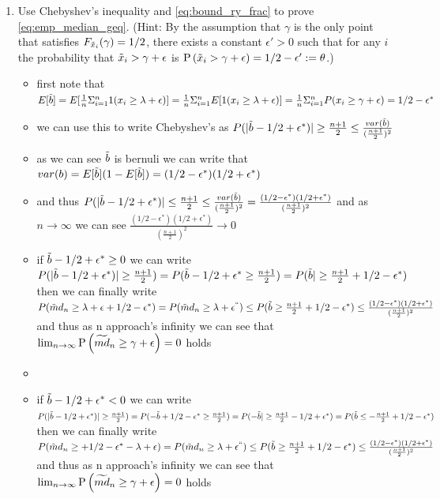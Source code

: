 \documentclass[12pt,twoside]{article}
\begin{document}
\begin{enumerate}
\begin{enumerate}
\item Use Chebyshev's inequality and \eqref{eq:bound_ry_frac} to prove \eqref{eq:emp_median_geq}. (Hint: By the assumption that $\gamma$ is the only point that satisfies $F_{\tilde{  x }_i}(\gamma) = 1/2$, there exists a constant  $\epsilon'>0$ such that for any $i$ the probability that $\tilde{  x }_i > \gamma + \epsilon$ is $\mathrm{P}\left( \tilde{  x }_i > \gamma + \epsilon \right) = 1/2 - \epsilon' := \theta$.)
\begin{itemize}
    \item first note that  $E[\Tilde{b}]=E[\frac{1}{n}\Sigma_{i=1}^{n}1(x_i\geq \lambda +\epsilon)]=\frac{1}{n}\Sigma_{i=1}^{n}E[1(x_i\geq \lambda +\epsilon)]=\frac{1}{n}\Sigma_{i=1}^{n}P(x_i\geq \gamma +\epsilon)=1/2 -\epsilon^{*}$
    \item we can use this to write Chebyshev's as $P(|\Tilde{b}-1/2 +\epsilon^{*})|\geq \frac{n+1}{2}\leq \frac{var(\Tilde{b})}{(\frac{n+1}{2})^2}$ 
    \item as we can see $\Tilde{b}$ is bernuli we can write that $var(b)=E[\Tilde{b}](1-E[\Tilde{b}])=(1/2 -\epsilon^{*})(1/2 +\epsilon^{*})$
    \item and thus $P(|\Tilde{b}-1/2 +\epsilon^{*})|\leq \frac{n+1}{2}\leq \frac{var(\Tilde{b})}{(\frac{n+1}{2})^2}=\frac{(1/2 -\epsilon^{*})(1/2 +\epsilon^{*})}{(\frac{n+1}{2})^2}$ and as $n\rightarrow \infty$ we can see $\frac{(1/2 -\epsilon^{*})(1/2 +\epsilon^{*})}{(\frac{n+1}{2})^2}\rightarrow 0$
    
    \item if $\Tilde{b}-1/2 +\epsilon^{*}\geq 0$  we can write $P(|\Tilde{b}-1/2 +\epsilon^{*})|\geq \frac{n+1}{2})=P(\Tilde{b}-1/2 +\epsilon^{*}\geq \frac{n+1}{2})=P(\Tilde{b}|\geq \frac{n+1}{2}+1/2 -\epsilon^{*})$ then we can finally write $P(\Tilde{m}d_n\geq \lambda +\epsilon+1/2-\epsilon^{*})= P(\Tilde{m}d_n\geq \lambda +\epsilon^{``})\leq P(\Tilde{b}\geq \frac{n+1}{2}+1/2 -\epsilon^{*})\leq  \frac{(1/2 -\epsilon^{*})(1/2 +\epsilon^{*})}{(\frac{n+1}{2})^2}$ and thus as n approach's infinity we can see that $\lim_{n\rightarrow \infty} \mathrm{P}\left(   \widetilde{md}_n  \geq \gamma + \epsilon \right) = 0$ holds
    \item     \item if $\Tilde{b}-1/2 +\epsilon^{*}< 0$  we can write $P(|\Tilde{b}-1/2 +\epsilon^{*})|\geq \frac{n+1}{2})=P(-\Tilde{b}+1/2 -\epsilon^{*}\geq \frac{n+1}{2})=P(-\Tilde{b}|\geq \frac{n+1}{2}-1/2 +\epsilon^{*})=P(\Tilde{b}\leq -\frac{n+1}{2}+1/2 -\epsilon^{*})$ then we can finally write $P(\Tilde{m}d_n\geq +1/2-\epsilon^{*}-\lambda +\epsilon)= P(\Tilde{m}d_n\geq \lambda +\epsilon^{``})\leq P(\Tilde{b}\geq \frac{n+1}{2}+1/2 -\epsilon^{*})\leq  \frac{(1/2 -\epsilon^{*})(1/2 +\epsilon^{*})}{(\frac{n+1}{2})^2}$ and thus as n approach's infinity we can see that $\lim_{n\rightarrow \infty} \mathrm{P}\left(   \widetilde{md}_n  \geq \gamma + \epsilon \right) = 0$ holds
\end{itemize}


\end{enumerate}
\end{enumerate}
\end{document}
